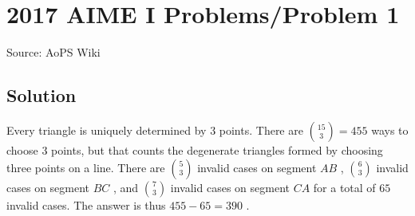 \documentclass[12pt]{article}
\begin{document}
\section*{{2017 AIME I Problems/Problem 1}}
Source: AoPS Wiki

\subsection*{Solution}
Every triangle is uniquely determined by 3 points. There are $\binom{15}{3}=455$ ways to choose 3 points, but that counts the degenerate triangles formed by choosing three points on a line. There are $\binom{5}{3}$ invalid cases on segment $AB$ , $\binom{6}{3}$ invalid cases on segment $BC$ , and $\binom{7}{3}$ invalid cases on segment $CA$ for a total of $65$ invalid cases. The answer is thus $455-65=\boxed{390}$ .
\end{document}
